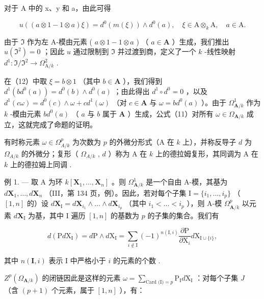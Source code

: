 对于 A 中的 x、y 和 a，由此可得

\[
u ((a \otimes 1 - 1 \otimes a) \xi) = d ^ {0} (m (\xi)) \wedge d ^ {0} (a), \quad \xi \in \mathrm{A} \otimes_ {k} \mathrm{A}, \quad a \in \mathrm{A}. \tag {12}
\]

由于 \(\mathfrak{I}\) 作为左 A-模由元素 ( \(a \otimes 1 - 1 \otimes a\) ) （ \(a \in \mathbf{A}\) ）生成，我们推出 \(u(\mathfrak{I}^2) = 0\) ；因此 \(u\) 通过限制到 \(\mathfrak{I}\) 并过渡到商，定义了一个 \(k\) -线性映射 \(d^1: \mathfrak{I}/\mathfrak{I}^2 \to \Omega_{\mathrm{A}/k}^2\) .

在（12）中取 \(\xi = b \otimes 1\) （其中 \(b \in \mathbf{A}\) ），我们得到 \(d^{1}(bd^{0}(a)) = d^{0}(b) \wedge d^{0}(a)\) ；由此得出 \(d^{1} \circ d^{0} = 0\) ，以及 \(d^{1}(c\omega) = d^{0}(c) \wedge \omega + cd^{1}(\omega)\) （对 \(c \in \mathbf{A}\) 与 \(\omega = bd^{0}(a)\) ）。由于 \(\Omega_{\mathbf{A}/k}^{1}\) 作为 \(k\) -模由元素 \(bd^{0}(a)\) （ \(a\) 与 \(b\) 属于 \(\mathbf{A}\) ）生成，公式（11）对所有 \(\omega \in \Omega_{\mathbf{A}/k}\) 成立，这就完成了命题的证明。

有时称元素 \(\omega\in\Omega_{A/k}^{p}\) 为次数为 \(p\) 的外微分形式（A 在 \(k\) 上），并称反导子 \(d\) 为 \(\Omega_{A/k}\) 的外微分；复形（ \(\Omega_{A/k}\) , \(d\) ）称为 A 在 \(k\) 上的德拉姆复形，其同调为 A 在 \(k\) 上的德拉姆上同调 .

例 1. --- 取 A 为环 \(k[\mathbf{X}_{1},\ldots,\mathbf{X}_{n}]\) 。则 \(\Omega_{\mathbf{A}/k}^{1}\) 是一个自由 A-模，其基为 \(d\mathbf{X}_{1},\ldots,d\mathbf{X}_{n}\) （III，第 134 页，例）。因此，若对每个子集 \(\mathrm{I}=\{i_{1},\ldots,i_{p}\}\) （ \([1,n]\) 的）设 \(d\mathbf{X}_{\mathrm{I}}=d\mathbf{X}_{i_{1}}\wedge\ldots\wedge d\mathbf{X}_{i_{p}}\) （其中 \(i_{1}<\ldots<i_{p}\) ），则 A-模 \(\Omega_{\mathbf{A}/k}^{p}\) 以元素 \(d\mathbf{X}_{\mathrm{I}}\) 为基，其中 I 遍历 \([1,n]\) 的基数为 \(p\) 的子集的集合。我们有

\[
d (\mathrm{P} d \mathrm{X} _ {\mathrm{I}}) = d \mathrm{P} \wedge d \mathrm{X} _ {\mathrm{I}} = \sum_ {i \notin \mathrm{I}} (- 1) ^ {n (\mathrm{I}, i)} \frac {\partial \mathrm{P}}{\partial \mathrm{X} _ {i}} d \mathrm{X} _ {\mathrm{I} \cup \{i \}},
\]

其中 \(n(\mathbf{I}, i)\) 表示 I 中严格小于 \(i\) 的元素的个数 .

\(Z^{p}(\Omega_{\mathbf{A}/k})\) 的闭链因此是这样的元素 \(\omega = \sum_{\text{Card (I)} = p} \mathrm{P}_{\mathrm{I}} d\mathrm{X}_{\mathrm{I}}\) ：对每个子集 \(J\) （含 \((p + 1)\) 个元素，属于 \([1, n]\) ），有：

